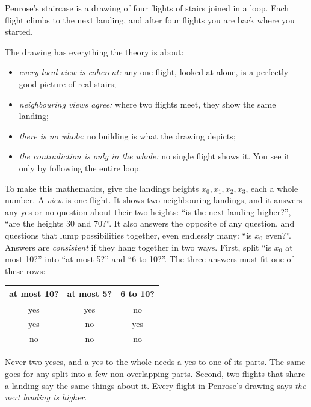 \documentclass[11pt]{article}
\theoremstyle{plain}
\theoremstyle{definition}
\begin{document}
Penrose's staircase is a drawing of four flights of stairs joined in a loop. Each
flight climbs to the next landing, and after four flights you are back where you
started.
\begin{center}
\end{center}
\noindent The drawing has everything the theory is about:
\begin{itemize}[nosep]
  \item \emph{every local view is coherent:} any one flight, looked at alone, is
    a perfectly good picture of real stairs;
  \item \emph{neighbouring views agree:} where two flights meet, they show the
    same landing;
  \item \emph{there is no whole:} no building is what the drawing depicts;
  \item \emph{the contradiction is only in the whole:} no single flight shows
    it. You see it only by following the entire loop.
\end{itemize}

To make this mathematics, give the landings heights $x_0,x_1,x_2,x_3$, each a
whole number. A \emph{view} is one flight. It shows two neighbouring landings,
and it answers any yes-or-no question about their two heights: ``is the next
landing higher?'', ``are the heights 30 and 70?''. It also answers the opposite
of any question, and questions that lump possibilities together, even endlessly
many: ``is $x_0$ even?''. Answers are \emph{consistent} if they hang together
in two ways. First, split ``is $x_0$ at most 10?'' into ``at most 5?'' and ``6 to
10?''. The three answers must fit one of these rows:
\begin{center}\small
\begin{tabular}{c | c c}
at most 10? & at most 5? & 6 to 10?\\\hline
yes & yes & no\\
yes & no & yes\\
no & no & no\\
\end{tabular}
\end{center}
Never two yeses, and a yes to the whole needs a yes to one of its parts. The
same goes for any split into a few non-overlapping parts. Second, two flights
that share a landing say the same things about it.
Every flight in Penrose's drawing says \emph{the next landing is higher}.
\end{document}

